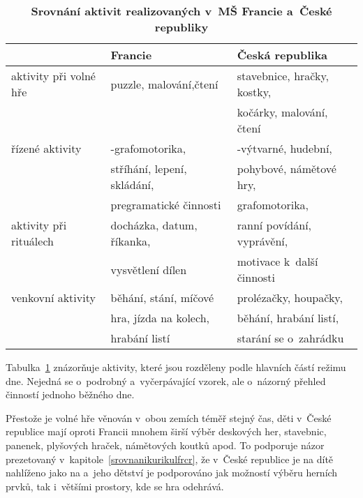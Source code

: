 
\begin{table}[h]
	\center
	\begin{tabular}{|l|l|l|}
	\hline
	\rowcolor{grey}
								& \textbf{Francie}				& \textbf{Česká republika}	\\
	\hline
	\hline
\rowcolor{grey!10}	 aktivity při volné hře	&puzzle, malování,čtení 	&stavebnice, hračky, kostky,\\ 
\rowcolor{grey!10}	 						&							&kočárky, malování, čtení \\ 
\rowcolor{grey!50}	 řízené aktivity  		&\uv{práce}-grafomotorika, 	&\uv{hra}-výtvarné, hudební, \\ 
\rowcolor{grey!50}	 						&stříhání, lepení, skládání,&pohybové, námětové hry, \\ 
\rowcolor{grey!50}	 						&pregramatické činnosti 	&grafomotorika, \\
\rowcolor{grey!10}	 aktivity při rituálech &docházka, datum, říkanka, 	&ranní povídání, vyprávění,\\ 
\rowcolor{grey!10}	 						&vysvětlení dílen			& motivace k~další činnosti\\ 
\rowcolor{grey!50}   venkovní aktivity 		& běhání, stání, míčové		& prolézačky, houpačky, \\
\rowcolor{grey!50}							&hra, jízda na kolech, 		&běhání, hrabání listí,	\\
\rowcolor{grey!50}							&hrabání listí				&starání se o~zahrádku	\\
	 \hline
	\end{tabular}
	
	\caption{ \textbf{Srovnání aktivit realizovaných v~MŠ Francie a~České republiky}
	}
	\label{srovnaniaktivit}
\end{table}
	
	Tabulka~\ref{srovnaniaktivit} znázorňuje aktivity, které jsou rozděleny podle hlavních částí režimu dne. Nejedná se o~podrobný a~vyčerpávající vzorek, ale o~názorný přehled činností jednoho běžného dne. 

	Přestože je volné hře věnován v~obou zemích téměř stejný čas, děti v~České republice mají oproti Francii mnohem širší výběr deskových her, stavebnic, panenek, plyšových hraček, námětových koutků apod. To podporuje názor prezetovaný v~kapitole~\ref{srovnanikurikulfrcr}, že v~České republice je na dítě nahlíženo jako na  a~jeho dětství je podporováno jak možností výběru herních prvků, tak i~většími prostory, kde se hra odehrává. 

